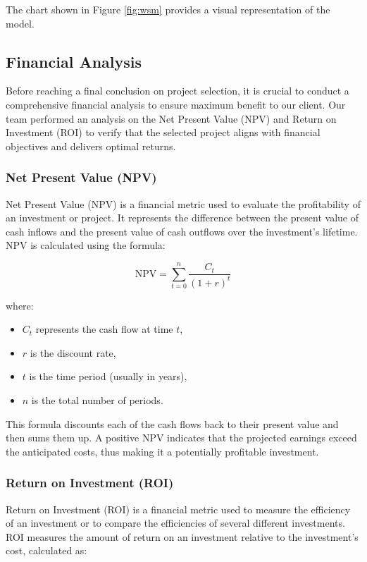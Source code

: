 The chart shown in Figure \ref{fig:wsm} provides a visual representation of the model.

\subsection{Financial Analysis}

Before reaching a final conclusion on project selection, it is crucial to conduct a comprehensive financial analysis to ensure maximum benefit to our client. Our team performed an analysis on the Net Present Value (NPV) and Return on Investment (ROI) to verify that the selected project aligns with financial objectives and delivers optimal returns.

\subsubsection*{Net Present Value (NPV)}
Net Present Value (NPV) is a financial metric used to evaluate the profitability of an investment or project. It represents the difference between the present value of cash inflows and the present value of cash outflows over the investment's lifetime. NPV is calculated using the formula:

\[
\text{NPV} = \sum_{t=0}^{n} \frac{C_t}{(1 + r)^t}
\]

where:
\begin{itemize}
    \item \( C_t \) represents the cash flow at time \( t \),
    \item \( r \) is the discount rate,
    \item \( t \) is the time period (usually in years),
    \item \( n \) is the total number of periods.
\end{itemize}

This formula discounts each of the cash flows back to their present value and then sums them up. A positive NPV indicates that the projected earnings exceed the anticipated costs, thus making it a potentially profitable investment.

\subsubsection*{Return on Investment (ROI)}
Return on Investment (ROI) is a financial metric used to measure the efficiency of an investment or to compare the efficiencies of several different investments. ROI measures the amount of return on an investment relative to the investment's cost, calculated as:


